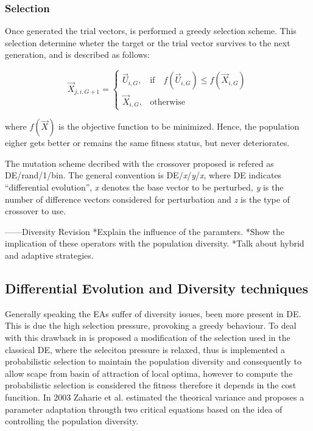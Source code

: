 \subsubsection{Selection}
Once generated the trial vectors, is performed a greedy selection scheme.
%
This selection determine wheter the target or the trial vector survives to the next generation, and is described as follows:

\begin{equation} \label{eqn:selection}
\vec{X}_{j,i,G+1}= 
\begin{cases}
    \vec{U}_{i,G},& \text{if} \quad f(\vec{U}_{i,G}) \leq f(\vec{X}_{i,G})  \\
    \vec{X}_{i,G},              & \text{otherwise}
\end{cases}
\end{equation}

where $f(\vec{X})$ is the objective function to be minimized.
%
Hence, the population eigher gets better or remains the same fitness status, but never deteriorates.

The mutation scheme decribed with the crossover proposed is refered as DE/rand/1/bin.
%
The general convention is DE/\textit{x}/\textit{y}/\textit{x}, where DE indicates ``differential evolution'', \textit{x} denotes the base vector to be perturbed, \textit{y} is the number of difference vectors considered for perturbation and \textit{z} is the type of crossover to use.

------Diversity Revision
*Explain the influence of the paramters.
*Show the implication of these operators with the population diversity.
*Talk about hybrid and adaptive strategies.



\subsection{Differential Evolution and Diversity techniques}

Generally speaking the EAs suffer of diversity issues, been more present in DE.
%
This is due the high selection pressure, provoking a greedy behaviour.
%
To deal with this drawback in \cite{sa2008exploration} is proposed a modification of the selection used in the classical DE, where the seleciton pressure is relaxed, thus is implemented a probabilistic selection to maintain the population diversity and consequently to allow scape from basin of attraction of local optima, however to compute the probabilistic selection is considered the fitness therefore it depends in the cost funcition.
%
In 2003 Zaharie et al.  \cite{zaharie2003control} estimated the theorical variance and proposes a parameter adaptation througth two critical equations based on the idea of controlling the population diversity.
%

